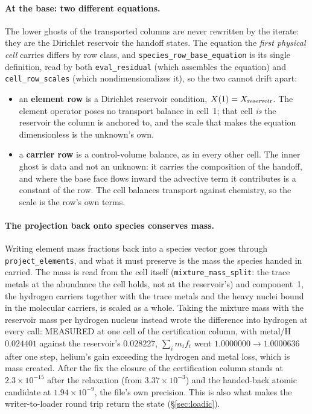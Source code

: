 \documentclass[english,a4paper]{my_memo}
\begin{document}
\paragraph{At the base: two different equations.}
The lower ghosts of the transported columns are never rewritten by the
iterate: they are the Dirichlet reservoir the handoff states. The equation
the \emph{first physical cell} carries differs by row class, and
\texttt{species\_row\_base\_equation} is its single definition, read by both
\texttt{eval\_residual} (which assembles the equation) and
\texttt{cell\_row\_scales} (which nondimensionalizes it), so the two cannot
drift apart:
\begin{itemize}
\item an \textbf{element row} is a Dirichlet reservoir condition,
  $X(1) = X_{\rm reservoir}$. The element operator poses no transport
  balance in cell~1; that cell \emph{is} the reservoir the column is
  anchored to, and the scale that makes the equation dimensionless is the
  unknown's own.
\item a \textbf{carrier row} is a control-volume balance, as in every other
  cell. The inner ghost is data and not an unknown: it carries the
  composition of the handoff, and where the base face flows inward the
  advective term it contributes is a constant of the row. The cell balances
  transport against chemistry, so the scale is the row's own terms.
\end{itemize}

\paragraph{The projection back onto species conserves mass.}
Writing element mass fractions back into a species vector goes through
\texttt{project\_elements}, and what it must preserve is the mass the
species handed in carried. The mass is read from the cell itself
(\texttt{mixture\_mass\_split}: the trace metals at the abundance the cell
holds, not at the reservoir's) and component~1, the hydrogen carriers
together with the trace metals and the heavy nuclei bound in the molecular
carriers, is scaled as a whole. Taking the mixture mass with the reservoir
mass per hydrogen nucleus instead wrote the difference into hydrogen at
every call: MEASURED at one cell of the certification column, with metal/H
$0.024401$ against the reservoir's $0.028227$, $\sum_i m_i f_i$ went
$1.0000000 \to 1.0000636$ after one step, helium's gain exceeding the
hydrogen and metal loss, which is mass created. After the fix the closure
of the certification column stands at $2.3\times10^{-15}$ after the
relaxation (from $3.37\times10^{-3}$) and the handed-back atomic candidate
at $1.94\times10^{-9}$, the file's own precision. This is also what makes
the writer-to-loader round trip return the state (\S\ref{sec:loadic}).
\end{document}
